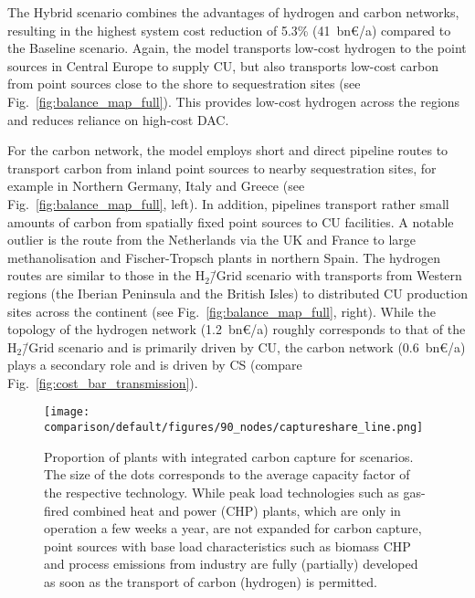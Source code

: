 \documentclass[twocolumn]{article}
\newcommand{\baselinescenario}{Baseline scenario}
\newcommand{\hydrogenscenario}{H$_2$\=/Grid scenario}
\newcommand{\hybridscenario}{Hybrid scenario}
\begin{document}
The \hybridscenario{} combines the advantages of hydrogen and carbon networks, resulting in the highest system cost reduction of 5.3\% (41~bn€/a) compared to the \baselinescenario{}. Again, the model transports low-cost hydrogen to the point sources in Central Europe to supply CU, but also transports low-cost carbon from point sources close to the shore to sequestration sites (see Fig.~\ref{fig:balance_map_full}). This provides low-cost hydrogen across the regions and reduces reliance on high-cost DAC.


For the carbon network, the model employs short and direct pipeline routes to transport carbon from inland point sources to nearby sequestration sites, for example in Northern Germany, Italy and Greece (see Fig.~\ref{fig:balance_map_full}, left). In addition, pipelines transport rather small amounts of carbon from spatially fixed point sources to CU facilities. A notable outlier is the route from the Netherlands via the UK and France to large methanolisation and Fischer-Tropsch plants in northern Spain.
The hydrogen routes are similar to those in the \hydrogenscenario{} with transports from Western regions (the Iberian Peninsula and the British Isles) to distributed CU production sites across the continent (see Fig.~\ref{fig:balance_map_full}, right).
While the topology of the hydrogen network (1.2~bn€/a) roughly corresponds to that of the \hydrogenscenario{} and is primarily driven by CU, the carbon network (0.6~bn€/a) plays a secondary role and is driven by CS (compare Fig.~\ref{fig:cost_bar_transmission}).


\begin{figure}[ht]
    \centering
    \texttt{[image: comparison/default/figures/90\_nodes/captureshare\_line.png]}
    \caption{Proportion of plants with integrated carbon capture for scenarios. The size of the dots corresponds to the average capacity factor of the respective technology. While peak load technologies such as gas-fired combined heat and power (CHP) plants, which are only in operation a few weeks a year, are not expanded for carbon capture, point sources with base load characteristics such as biomass CHP and process emissions from industry are fully (partially) developed as soon as the transport of carbon (hydrogen) is permitted.}
    \label{fig:captureshare_line}
\end{figure}%
\end{document}
